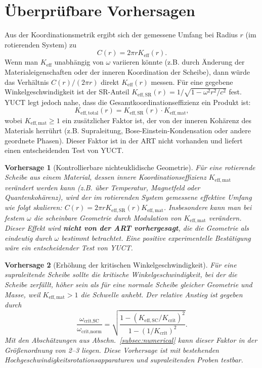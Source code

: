 \documentclass[12pt,a4paper]{article}
\newtheorem{prediction}{Vorhersage}[section]
\begin{document}
	\section{Überprüfbare Vorhersagen}
	\label{sec:predict}
	
	Aus der Koordinationsmetrik ergibt sich der gemessene Umfang bei Radius \(r\) (im rotierenden System) zu
	\[
	C(r) = 2\pi r K_{\mathrm{eff}}(r).
	\]
	Wenn man \(K_{\mathrm{eff}}\) unabhängig von \(\omega\) variieren könnte (z.B. durch Änderung der Materialeigenschaften oder der inneren Koordination der Scheibe), dann würde das Verhältnis \(C(r)/(2\pi r)\) direkt \(K_{\mathrm{eff}}(r)\) messen. Für eine gegebene Winkelgeschwindigkeit ist der SR-Anteil \(K_{\mathrm{eff,SR}}(r) = 1/\sqrt{1-\omega^2 r^2/c^2}\) fest. YUCT legt jedoch nahe, dass die Gesamtkoordinationseffizienz ein Produkt ist:
	\[
	K_{\mathrm{eff,total}}(r) = K_{\mathrm{eff,SR}}(r) \cdot K_{\mathrm{eff,mat}},
	\]
	wobei \(K_{\mathrm{eff,mat}} \ge 1\) ein zusätzlicher Faktor ist, der von der inneren Kohärenz des Materials herrührt (z.B. Supraleitung, Bose-Einstein-Kondensation oder andere geordnete Phasen). Dieser Faktor ist in der ART nicht vorhanden und liefert einen entscheidenden Test von YUCT.
	
	\begin{prediction}[Kontrollierbare nichteuklidische Geometrie]
		Für eine rotierende Scheibe aus einem Material, dessen innere Koordinationseffizienz \(K_{\mathrm{eff,mat}}\) verändert werden kann (z.B. über Temperatur, Magnetfeld oder Quantenkohärenz), wird der im rotierenden System gemessene effektive Umfang wie folgt skalieren: \(C(r) = 2\pi r K_{\mathrm{eff,SR}}(r) K_{\mathrm{eff,mat}}\). Insbesondere kann man bei festem \(\omega\) die scheinbare Geometrie durch Modulation von \(K_{\mathrm{eff,mat}}\) verändern. Dieser Effekt wird \textbf{nicht von der ART vorhergesagt}, die die Geometrie als eindeutig durch \(\omega\) bestimmt betrachtet. Eine positive experimentelle Bestätigung wäre ein entscheidender Test von YUCT.
	\end{prediction}
	
	\begin{prediction}[Erhöhung der kritischen Winkelgeschwindigkeit]
		Für eine supraleitende Scheibe sollte die kritische Winkelgeschwindigkeit, bei der die Scheibe zerfällt, höher sein als für eine normale Scheibe gleicher Geometrie und Masse, weil \(K_{\mathrm{eff,mat}} > 1\) die Schwelle anhebt. Der relative Anstieg ist gegeben durch
		\[
		\frac{\omega_{\text{crit,SC}}}{\omega_{\text{crit,norm}}} = \sqrt{ \frac{1 - (K_{\mathrm{eff,SC}}/K_{\mathrm{crit}})^2}{1 - (1/K_{\mathrm{crit}})^2} }.
		\]
		Mit den Abschätzungen aus Abschn.~\ref{subsec:numerical} kann dieser Faktor in der Größenordnung von 2–3 liegen. Diese Vorhersage ist mit bestehenden Hochgeschwindigkeitsrotationsapparaturen und supraleitenden Proben testbar.
	\end{prediction}
	
\end{document}
